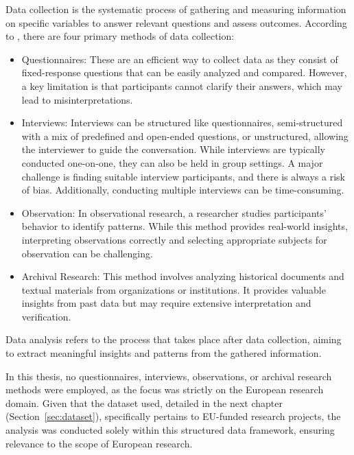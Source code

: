 Data collection is the systematic process of gathering and measuring information on specific variables to answer relevant questions and assess outcomes.
According to \textcite{SaundersMark2023}, there are four primary methods of data collection:
\begin{itemize}
    \item Questionnaires: These are an efficient way to collect data as they consist of fixed-response questions that can be easily analyzed and compared. However, a key limitation is that participants cannot clarify their answers, which may lead to misinterpretations.
    \item Interviews: Interviews can be structured like questionnaires, semi-structured with a mix of predefined and open-ended questions, or unstructured, allowing the interviewer to guide the conversation. While interviews are typically conducted one-on-one, they can also be held in group settings. A major challenge is finding suitable interview participants, and there is always a risk of bias. Additionally, conducting multiple interviews can be time-consuming.
    \item Observation: In observational research, a researcher studies participants' behavior to identify patterns. While this method provides real-world insights, interpreting observations correctly and selecting appropriate subjects for observation can be challenging.
    \item Archival Research: This method involves analyzing historical documents and textual materials from organizations or institutions. It provides valuable insights from past data but may require extensive interpretation and verification.
\end{itemize}

Data analysis refers to the process that takes place after data collection, aiming to extract meaningful insights and patterns from the gathered information.

In this thesis, no questionnaires, interviews, observations, or archival research methods were employed, as the focus was strictly on the European research domain.
Given that the dataset used, detailed in the next chapter (Section~\ref{sec:dataset}), specifically pertains to EU-funded research projects, the analysis was conducted solely within this structured data framework, ensuring relevance to the scope of European research.
